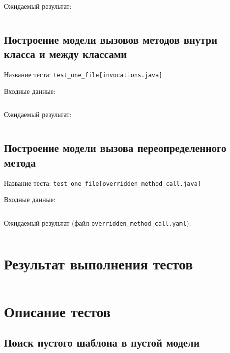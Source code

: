 \inputminted{java}{../src/test/data/src/dependencies.java}

Ожидаемый результат:

\inputminted{yaml}{../src/test/data/model/dependencies.yaml}

\subsection*{Построение модели вызовов методов внутри класса и между классами}

Название теста: \verb;test_one_file[invocations.java];

Входные данные:

\inputminted{java}{../src/test/data/src/invocations.java}

Ожидаемый результат:

\inputminted{yaml}{../src/test/data/model/invocations.yaml}

\subsection*{Построение модели вызова переопределенного метода}

Название теста: \verb;test_one_file[overridden_method_call.java];

Входные данные:

\inputminted{java}{../src/test/data/src/overridden_method_call.java}

Ожидаемый результат (файл \verb;overridden_method_call.yaml;):

\inputminted{yaml}{../src/test/data/model/overridden_method_call.yaml}

\section*{Результат выполнения тестов}

\inputminted{text}{inc/java_bytecode_model_test.log}


\section*{Описание тестов}

\subsection*{Поиск пустого шаблона в пустой модели}

